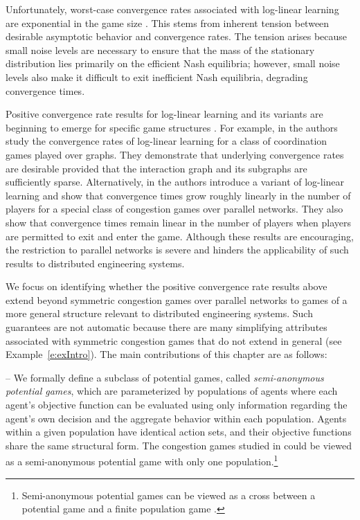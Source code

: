 Unfortunately, worst-case convergence rates associated with log-linear learning are exponential in the game size \cite{Shah2010}.  This stems from inherent tension between desirable asymptotic behavior and convergence rates.  The tension arises because small noise levels are necessary to ensure that the mass of the stationary distribution lies primarily on the efficient Nash equilibria; however, small noise levels also make it difficult to exit inefficient Nash equilibria,  degrading convergence times.  

Positive convergence rate results for log-linear learning and its variants are beginning to emerge for specific game structures \cite{Montanari2010,Kreindler2011,Shah2010,Arieli2011}.  For example, in \cite{Montanari2010} the authors study the convergence rates of log-linear learning for a class of coordination games played over graphs. They demonstrate that underlying convergence rates are desirable provided that the interaction graph and its subgraphs are sufficiently sparse.  Alternatively, in \cite{Shah2010} the authors introduce a variant of log-linear learning and show that  convergence times grow roughly linearly in the number of players for a special class of congestion games over parallel networks.  They also show that convergence times remain linear in the number of players when players are permitted to exit and enter the game.  Although these results are encouraging, the restriction to parallel networks is severe and hinders the applicability of such results to distributed engineering systems.  

We focus on identifying whether the positive convergence rate results above extend beyond symmetric congestion games over parallel networks to games of a more general structure relevant to distributed engineering systems.  Such guarantees are not automatic because there are many simplifying attributes associated with symmetric congestion games that do not extend in general (see Example~\ref{e:exIntro}).  The main contributions of this chapter are as follows:

\vspace{.1cm}
%
\noindent -- We formally define a subclass of potential games, called \emph{semi-anonymous potential games}, which are parameterized by populations of agents where each agent's objective function can be evaluated using only information regarding the agent's own decision and the aggregate behavior within each population.  Agents within a given population have identical action sets, and their objective functions share the same structural form.  The congestion games studied in \cite{Shah2010} could be viewed as a semi-anonymous potential game with only one population.\footnote{Semi-anonymous potential games can be viewed as a cross between a potential game and a finite population game \cite{Blume1996}.}

